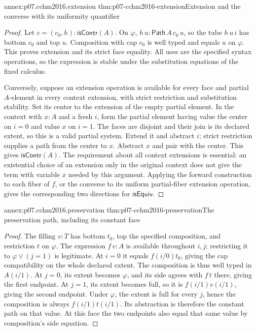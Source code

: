 \begin{annexitem}{annex:p07.cchm2016.extension}
 {thm:p07-cchm2016-extension}{Extension and the converse with its uniformity quantifier}
\begin{proof}
Let \(c=(c_0,h):\mathsf{isContr}(A)\).
On \(\varphi\), \(h\,u:\mathsf{Path}\,A\,c_0\,u\), so the
tube \(h\,u\,i\) has bottom \(c_0\) and top \(u\).
Composition with cap \(c_0\) is well typed and equals \(u\) on
\(\varphi\).  This proves extension and its strict face equality.
All uses are the specified syntax operations, so the expression is
stable under the substitution equations of the fixed calculus.

Conversely, suppose an extension operation is available for every
face and partial \(A\)-element in every context extension, with strict
restriction and substitution stability.  Set its center to the
extension of the empty partial element.  In the context with \(x:A\)
and a fresh \(i\), form the partial element having value the center
on \(i=0\) and value \(x\) on \(i=1\).  The faces are disjoint and
their join is its declared extent, so this is a valid partial system.
Extend it and abstract \(i\); strict restriction supplies a path from
the center to \(x\).  Abstract \(x\) and pair with the center.
This gives \(\mathsf{isContr}(A)\).
The requirement about all context extensions is essential: an
existential choice of an extension only in the original context
does not give the term with variable \(x\) needed by this argument.
Applying the forward construction to each fiber of \(f\), or the
converse to its uniform partial-fiber extension operation, gives the
corresponding two directions for \(\mathsf{isEquiv}\).
\end{proof}
\end{annexitem}

\begin{annexitem}{annex:p07.cchm2016.preservation}
 {thm:p07-cchm2016-preservation}{The preservation path, including its constant face}
\begin{proof}
The filling \(v:T\) has bottom \(t_0\), top the specified composition,
and restriction \(t\) on \(\varphi\).
The expression \(f\,v:A\) is available throughout \(i,j\); restricting
it to \(\varphi\vee(j=1)\) is legitimate.  At \(i=0\) it equals
\(f(i/0)t_0\), giving the cap compatibility on the whole declared
extent.  The composition is thus well typed in \(A(i/1)\).
At \(j=0\), its extent becomes \(\varphi\), and its side agrees with
\(f\,t\) there, giving the first endpoint.
At \(j=1\), its extent becomes full, so it is
\(f(i/1)v(i/1)\), giving the second endpoint.
Under \(\varphi\), the extent is full for every \(j\), hence the
composition is always \(f(i/1)t(i/1)\).  Its abstraction is therefore
the constant path on that value.  At this face the two endpoints
also equal that same value by composition's side equation.
\end{proof}
\end{annexitem}

